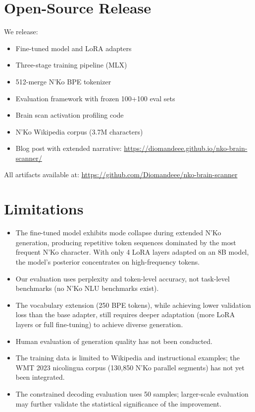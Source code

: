 \documentclass[11pt]{article}
\begin{document}
\section{Open-Source Release}
\label{sec:release}

We release:
\begin{itemize}
\item Fine-tuned model and LoRA adapters
\item Three-stage training pipeline (MLX)
\item 512-merge N'Ko BPE tokenizer
\item Evaluation framework with frozen 100+100 eval sets
\item Brain scan activation profiling code
\item N'Ko Wikipedia corpus (3.7M characters)
\item Blog post with extended narrative: \url{https://diomandeee.github.io/nko-brain-scanner/}
\end{itemize}

All artifacts available at: \url{https://github.com/Diomandeee/nko-brain-scanner}

\section{Limitations}

\begin{itemize}
\item The fine-tuned model exhibits mode collapse during extended N'Ko generation, producing repetitive token sequences dominated by the most frequent N'Ko character. With only 4 LoRA layers adapted on an 8B model, the model's posterior concentrates on high-frequency tokens.
\item Our evaluation uses perplexity and token-level accuracy, not task-level benchmarks (no N'Ko NLU benchmarks exist).
\item The vocabulary extension (250 BPE tokens), while achieving lower validation loss than the base adapter, still requires deeper adaptation (more LoRA layers or full fine-tuning) to achieve diverse generation.
\item Human evaluation of generation quality has not been conducted.
\item The training data is limited to Wikipedia and instructional examples; the WMT 2023 nicolingua corpus (130,850 N'Ko parallel segments) has not yet been integrated.
\item The constrained decoding evaluation uses 50 samples; larger-scale evaluation may further validate the statistical significance of the improvement.
\end{itemize}
\end{document}
